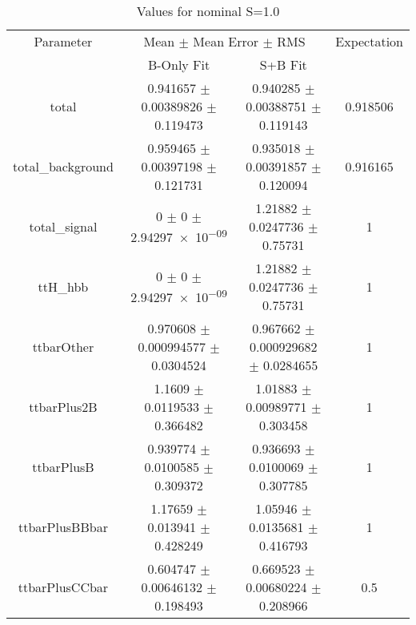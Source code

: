 \begin{table}
\centering
\caption{Values for nominal S=1.0}
\begin{tabular}{cccc}
\toprule
Parameter & \multicolumn{2}{c}{Mean $\pm$ Mean Error $\pm$ RMS} & Expectation\\
 & B-Only Fit & S+B Fit & \\
\midrule
total & \num{0.941657} $\pm$ \num{0.00389826} $\pm$ \num{0.119473} & \num{0.940285} $\pm$ \num{0.00388751} $\pm$ \num{0.119143} & \num{0.918506}\\
total\_background & \num{0.959465} $\pm$ \num{0.00397198} $\pm$ \num{0.121731} & \num{0.935018} $\pm$ \num{0.00391857} $\pm$ \num{0.120094} & \num{0.916165}\\
total\_signal & \num{0} $\pm$ \num{0} $\pm$ \num{2.94297e-09} & \num{1.21882} $\pm$ \num{0.0247736} $\pm$ \num{0.75731} & \num{1}\\
ttH\_hbb & \num{0} $\pm$ \num{0} $\pm$ \num{2.94297e-09} & \num{1.21882} $\pm$ \num{0.0247736} $\pm$ \num{0.75731} & \num{1}\\
ttbarOther & \num{0.970608} $\pm$ \num{0.000994577} $\pm$ \num{0.0304524} & \num{0.967662} $\pm$ \num{0.000929682} $\pm$ \num{0.0284655} & \num{1}\\
ttbarPlus2B & \num{1.1609} $\pm$ \num{0.0119533} $\pm$ \num{0.366482} & \num{1.01883} $\pm$ \num{0.00989771} $\pm$ \num{0.303458} & \num{1}\\
ttbarPlusB & \num{0.939774} $\pm$ \num{0.0100585} $\pm$ \num{0.309372} & \num{0.936693} $\pm$ \num{0.0100069} $\pm$ \num{0.307785} & \num{1}\\
ttbarPlusBBbar & \num{1.17659} $\pm$ \num{0.013941} $\pm$ \num{0.428249} & \num{1.05946} $\pm$ \num{0.0135681} $\pm$ \num{0.416793} & \num{1}\\
ttbarPlusCCbar & \num{0.604747} $\pm$ \num{0.00646132} $\pm$ \num{0.198493} & \num{0.669523} $\pm$ \num{0.00680224} $\pm$ \num{0.208966} & \num{0.5}\\
\bottomrule
\end{tabular}
\end{table}